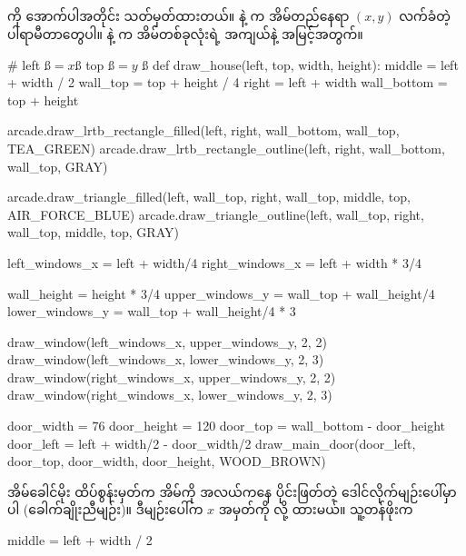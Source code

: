 \subsection*{}
 ကို အောက်ပါအတိုင်း သတ်မှတ်ထားတယ်။  နဲ့  က အိမ်တည်နေရာ $(x, y)$ လက်ခံတဲ့ ပါရာမီတာတွေပါ။  နဲ့  က အိမ်တစ်ခုလုံးရဲ့ အကျယ်နဲ့ အမြင့်အတွက်။ 
%
\begin{py}
# left ß$= x$ß top ß$= y$ ß
def draw_house(left, top, width, height):
    middle = left + width / 2
    wall_top = top + height / 4
    right = left + width
    wall_bottom = top + height

    arcade.draw_lrtb_rectangle_filled(left, right,
                                      wall_bottom, wall_top,
                                      TEA_GREEN)
    arcade.draw_lrtb_rectangle_outline(left, right,
                                       wall_bottom, wall_top,
                                       GRAY)

    arcade.draw_triangle_filled(left, wall_top, 
                                right, wall_top, 
                                middle, top,
                                AIR_FORCE_BLUE)
    arcade.draw_triangle_outline(left, wall_top,
                                 right, wall_top,
                                 middle, top,
                                 GRAY)

    left_windows_x = left + width/4
    right_windows_x = left + width * 3/4

    wall_height = height * 3/4
    upper_windows_y = wall_top + wall_height/4
    lower_windows_y = wall_top + wall_height/4 * 3

    draw_window(left_windows_x, upper_windows_y, 2, 2)
    draw_window(left_windows_x, lower_windows_y, 2, 3)
    draw_window(right_windows_x, upper_windows_y, 2, 2)
    draw_window(right_windows_x, lower_windows_y, 2, 3)

    door_width = 76
    door_height = 120
    door_top = wall_bottom - door_height
    door_left = left + width/2 - door_width/2
    draw_main_door(door_left, door_top, 
                   door_width, door_height, 
                   WOOD_BROWN)
\end{py}
%
အိမ်ခေါင်မိုး ထိပ်စွန်းမှတ်က အိမ်ကို အလယ်ကနေ ပိုင်းဖြတ်တဲ့ ဒေါင်လိုက်မျဉ်းပေါ်မှာပါ (ခေါက်ချိုးညီမျဉ်း)။ ဒီမျဉ်းပေါ်က $x$ အမှတ်ကို  လို့ ထားမယ်။  သူ့တန်ဖိုးက
\begin{codetxt}
middle = left + width / 2
\end{codetxt}
